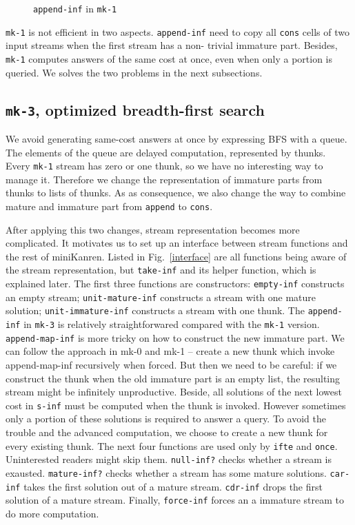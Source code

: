\documentclass[format=acmlarge, review=true, authordraft=true]{acmart}
\begin{document}
\begin{figure}
	 	
	 \caption{\texttt{append-inf} in \texttt{mk-1}}
	 \label{append-inf-1}
\end{figure}

\texttt{mk-1} is not efficient in two aspects. \texttt{append-inf} need to copy 
all \texttt{cons} cells of two input streams when the first stream has a non-
trivial immature part. Besides, \texttt{mk-1} computes answers of the same cost 
at once, even when only a portion is queried. We solves the two problems in the 
next subsections.

\subsection{\texttt{mk-3}, optimized breadth-first search}

We avoid generating same-cost answers at once by expressing BFS with a queue. 
The elements of the queue are delayed computation, represented by thunks. Every 
\texttt{mk-1} stream has zero or one thunk, so we have no interesting way to 
manage it. Therefore we change the representation of immature parts from thunks 
to lists of thunks. As as consequence, we also change the way to combine mature 
and immature part from \texttt{append} to \texttt{cons}. 

After applying this two changes, stream representation becomes more 
complicated. It motivates us to set up an interface between stream functions 
and the rest of miniKanren. Listed in Fig.~\ref{interface} are all functions 
being aware of the stream representation, but \texttt{take-inf} and its helper 
function, which is explained later. The first three functions are constructors: 
\texttt{empty-inf} constructs an empty stream; \texttt{unit-mature-inf} 
constructs a stream with one mature solution; \texttt{unit-immature-inf} 
constructs a stream with one thunk. The \texttt{append-inf} in \texttt{mk-3} is 
relatively straightforwared compared with the \texttt{mk-1} version. 
\texttt{append-map-inf} is more tricky on how to construct the new immature 
part. We can follow the approach in mk-0 and mk-1 -- create a new thunk which 
invoke append-map-inf recursively when forced. But then we need to be careful: 
if we construct the thunk when the old immature part is an empty list, the 
resulting stream might be infinitely unproductive. Beside, all solutions of the 
next lowest cost in \texttt{s-inf} must be computed when the thunk is invoked. 
However sometimes only a portion of these solutions is required to answer a 
query. To avoid the trouble and the advanced computation, we choose to create a 
new thunk for every existing thunk. The next four functions are used only by 
\texttt{ifte} and \texttt{once}. Uninterested readers might skip them. 
\texttt{null-inf?} checks whether a stream is exausted. \texttt{mature-inf?} 
checks whether a stream has some mature solutions. \texttt{car-inf} takes the 
first solution out of a mature stream. \texttt{cdr-inf} drops the first 
solution of a mature stream. Finally, \texttt{force-inf} forces an a immature 
stream to do more computation.
\end{document}
